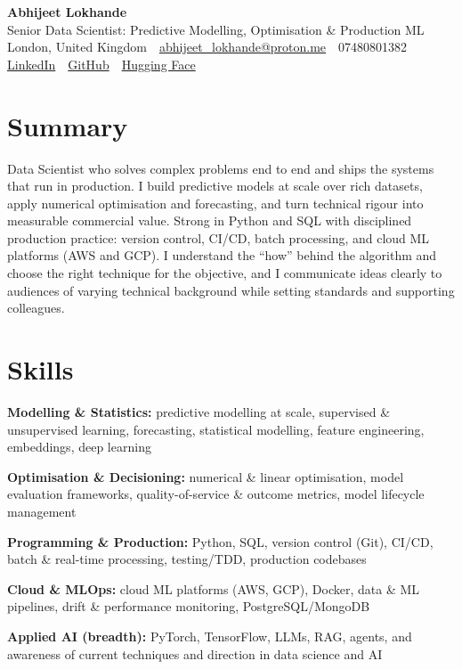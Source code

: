 \documentclass[10pt,a4paper]{article}
\newcommand{\sep}{\,\textcolor{accent!60}{\textbar}\,}
\begin{document}
\begin{center}
  {\fontsize{24}{26}\selectfont\bfseries Abhijeet Lokhande}\\[3pt]
  {\color{accent}\large Senior Data Scientist: Predictive Modelling, Optimisation \& Production ML}\\[5pt]
  {\small
    London, United Kingdom \sep
    \href{mailto:abhijeet_lokhande@proton.me}{abhijeet\_lokhande@proton.me} \sep
    07480801382 \\[2pt]
    \href{https://www.linkedin.com/in/ablds/}{LinkedIn} \sep
    \href{https://github.com/abhijeetscode}{GitHub} \sep
    \href{https://huggingface.co/ab-ai}{Hugging Face}
  }
\end{center}
\vspace{2pt}

\section{Summary}
Data Scientist who solves complex problems end to end and ships the systems that run in production. I build predictive models at scale over rich datasets, apply numerical optimisation and forecasting, and turn technical rigour into measurable commercial value. Strong in Python and SQL with disciplined production practice: version control, CI/CD, batch processing, and cloud ML platforms (AWS and GCP). I understand the ``how'' behind the algorithm and choose the right technique for the objective, and I communicate ideas clearly to audiences of varying technical background while setting standards and supporting colleagues.

\section{Skills}
\begin{tight}
  \item[\textcolor{accent}{\small$\bullet$}] \textbf{Modelling \& Statistics:} predictive modelling at scale, supervised \& unsupervised learning, forecasting, statistical modelling, feature engineering, embeddings, deep learning
  \item[\textcolor{accent}{\small$\bullet$}] \textbf{Optimisation \& Decisioning:} numerical \& linear optimisation, model evaluation frameworks, quality-of-service \& outcome metrics, model lifecycle management
  \item[\textcolor{accent}{\small$\bullet$}] \textbf{Programming \& Production:} Python, SQL, version control (Git), CI/CD, batch \& real-time processing, testing/TDD, production codebases
  \item[\textcolor{accent}{\small$\bullet$}] \textbf{Cloud \& MLOps:} cloud ML platforms (AWS, GCP), Docker, data \& ML pipelines, drift \& performance monitoring, PostgreSQL/MongoDB
  \item[\textcolor{accent}{\small$\bullet$}] \textbf{Applied AI (breadth):} PyTorch, TensorFlow, LLMs, RAG, agents, and awareness of current techniques and direction in data science and AI
\end{tight}
\end{document}
